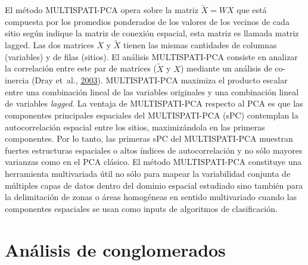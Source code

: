\documentclass[11pt,b5paper,]{krantz}
\begin{document}
El método MULTISPATI-PCA opera sobre la matriz \(\widetilde{X}=WX\) que
está compuesta por los promedios ponderados de los valores de los
vecinos de cada sitio según indique la matriz de conexión espacial, esta
matriz es llamada matriz lagged. Las dos matrices \(X\) y
\(\widetilde{X}\) tienen las mismas cantidades de columnas (variables) y
de filas (sitios). El análisis MULTISPATI-PCA consiste en analizar la
correlación entre este par de matrices (\(\widetilde{X}\) y \(X\))
mediante un análisis de co-inercia (Dray et~al.,
\protect\hyperlink{ref-Dray_Chessel_Thioulouse_2003}{2003}).
MULTISPATI-PCA maximiza el producto escalar entre una combinación lineal
de las variables originales y una combinación lineal de variables
\emph{lagged}. La ventaja de MULTISPATI-PCA respecto al PCA es que las
componentes principales espaciales del MULTISPATI-PCA (sPC) contemplan
la autocorrelación espacial entre los sitios, maximizándola en las
primeras componentes. Por lo tanto, las primeras sPC del MULTISPATI-PCA
muestran fuertes estructuras espaciales o altos índices de
autocorrelación y no sólo mayores varianzas como en el PCA clásico. El
método MULTISPATI-PCA constituye una herramienta multivariada útil no
sólo para mapear la variabilidad conjunta de múltiples capas de datos
dentro del dominio espacial estudiado sino también para la delimitación
de zonas o áreas homogéneas en sentido multivariado cuando las
componentes espaciales se usan como inputs de algoritmos de
clasificación.

\section{Análisis de conglomerados}\label{anuxe1lisis-de-conglomerados}
\end{document}

